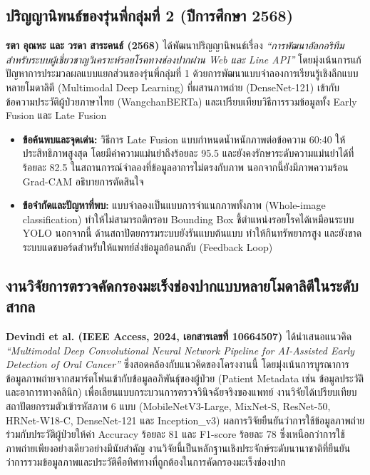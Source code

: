 \subsection{ปริญญานิพนธ์ของรุ่นพี่กลุ่มที่ 2 (ปีการศึกษา 2568)}
\textbf{รตา อุณหะ และ วรดา สาระคนธ์ (2568) \cite{unnahasarakhon2025multimodal}} ได้พัฒนาปริญญานิพนธ์เรื่อง \textit{``การพัฒนาอัลกอริทึมสำหรับระบบผู้เชี่ยวชาญวิเคราะห์รอยโรคทางช่องปากผ่าน Web และ Line API''} โดยมุ่งเน้นการแก้ปัญหาการประมวลผลแบบแยกส่วนของรุ่นพี่กลุ่มที่ 1 ด้วยการพัฒนาแบบจำลองการเรียนรู้เชิงลึกแบบหลายโมดาลิตี (Multimodal Deep Learning) ที่ผสานภาพถ่าย (DenseNet-121) เข้ากับข้อความประวัติผู้ป่วยภาษาไทย (WangchanBERTa) และเปรียบเทียบวิธีการรวมข้อมูลทั้ง Early Fusion และ Late Fusion
\begin{itemize}
    \item \textbf{ข้อค้นพบและจุดเด่น:} วิธีการ Late Fusion แบบกำหนดน้ำหนักภาพต่อข้อความ 60:40 ให้ประสิทธิภาพสูงสุด โดยมีค่าความแม่นยำถึงร้อยละ 95.5 และยังคงรักษาระดับความแม่นยำได้ที่ร้อยละ 82.5 ในสถานการณ์จำลองที่ข้อมูลอาการไม่ตรงกับภาพ นอกจากนี้ยังมีภาพความร้อน Grad-CAM อธิบายการตัดสินใจ
    \item \textbf{ข้อจำกัดและปัญหาที่พบ:} แบบจำลองเป็นแบบการจำแนกภาพทั้งภาพ (Whole-image classification) ทำให้ไม่สามารถตีกรอบ Bounding Box ชี้ตำแหน่งรอยโรคได้เหมือนระบบ YOLO นอกจากนี้ ด้านสถาปัตยกรรมระบบยังรันแบบต้นแบบ ทำให้กินทรัพยากรสูง และยังขาดระบบแดชบอร์ดสำหรับให้แพทย์ส่งข้อมูลย้อนกลับ (Feedback Loop)
\end{itemize}

\subsection{งานวิจัยการตรวจคัดกรองมะเร็งช่องปากแบบหลายโมดาลิตีในระดับสากล}
\textbf{Devindi et al. (IEEE Access, 2024, เอกสารเลขที่ 10664507) \cite{devindi2024multimodal}} ได้นำเสนอแนวคิด \textit{``Multimodal Deep Convolutional Neural Network Pipeline for AI-Assisted Early Detection of Oral Cancer''} ซึ่งสอดคล้องกับแนวคิดของโครงงานนี้ โดยมุ่งเน้นการบูรณาการข้อมูลภาพถ่ายจากสมาร์ตโฟนเข้ากับข้อมูลอภิพันธุ์ของผู้ป่วย (Patient Metadata เช่น ข้อมูลประวัติและอาการทางคลินิก) เพื่อเลียนแบบกระบวนการตรวจวินิจฉัยจริงของแพทย์ งานวิจัยได้เปรียบเทียบสถาปัตยกรรมตัวเข้ารหัสภาพ 6 แบบ (MobileNetV3-Large, MixNet-S, ResNet-50, HRNet-W18-C, DenseNet-121 และ Inception\_v3) ผลการวิจัยยืนยันว่าการใช้ข้อมูลภาพถ่ายร่วมกับประวัติผู้ป่วยให้ค่า Accuracy ร้อยละ 81 และ F1-score ร้อยละ 78 ซึ่งเหนือกว่าการใช้ภาพถ่ายเพียงอย่างเดียวอย่างมีนัยสำคัญ งานวิจัยนี้เป็นหลักฐานเชิงประจักษ์ระดับนานาชาติที่ยืนยันว่าการรวมข้อมูลภาพและประวัติคือทิศทางที่ถูกต้องในการคัดกรองมะเร็งช่องปาก

